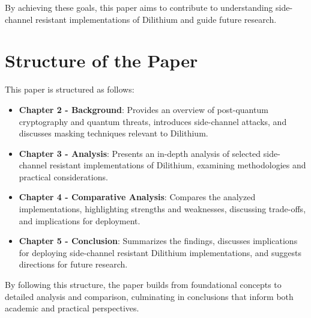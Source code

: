 By achieving these goals, this paper aims to contribute to understanding side-channel resistant implementations of Dilithium and guide future research.

\section{Structure of the Paper}

This paper is structured as follows:

\begin{itemize}
    \item \textbf{Chapter 2 - Background}: Provides an overview of post-quantum cryptography and quantum threats, introduces side-channel attacks, and discusses masking techniques relevant to Dilithium.
    \item \textbf{Chapter 3 - Analysis}: Presents an in-depth analysis of selected side-channel resistant implementations of Dilithium, examining methodologies and practical considerations.
    \item \textbf{Chapter 4 - Comparative Analysis}: Compares the analyzed implementations, highlighting strengths and weaknesses, discussing trade-offs, and implications for deployment.
    \item \textbf{Chapter 5 - Conclusion}: Summarizes the findings, discusses implications for deploying side-channel resistant Dilithium implementations, and suggests directions for future research.
\end{itemize}

By following this structure, the paper builds from foundational concepts to detailed analysis and comparison, culminating in conclusions that inform both academic and practical perspectives.
